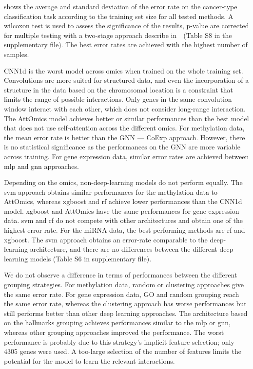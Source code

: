 \documentclass[../main.tex]{subfiles}
\begin{document}
 shows the average and standard deviation of the error rate on the cancer-type classification task according to the training set size for all tested methods.
A wilcoxon test is used to assess the significance of the results, p-value are corrected for multiple testing with a two-stage approach describe in~\cite{10.2307/2346101}~(Table S8 in the supplementary file).
The best error rates are achieved with the highest number of samples.

CNN1d is the worst model across omics when trained on the whole training set.
Convolutions are more suited for structured data, and even the incorporation of a structure in the data based on the chromosomal location is a constraint that limits the range of possible interactions.
Only genes in the same convolution window interact with each other, which does not consider long-range interaction.
The AttOmics model achieves better or similar performances than the best model that does not use self-attention across the different omics.
For methylation data, the mean error rate is better than the GNN --- CoExp approach.
However, there is no statistical significance as the performances on the GNN are more variable across training.
For gene expression data, similar error rates are achieved between \gls{mlp} and \gls{gnn} approaches.

Depending on the omics, non-deep-learning models do not perform equally.
The \gls{svm} approach obtains similar performances for the methylation data to AttOmics, whereas \gls{xgboost} and \gls{rf} achieve lower performances than the CNN1d model.
\gls{xgboost} and AttOmics have the same performances for gene expression data.
\gls{svm} and \gls{rf} do not compete with other architectures and obtain one of the highest error-rate.
For the miRNA data, the best-performing methods are \gls{rf} and \gls{xgboost}.
The \gls{svm} approach obtains an error-rate comparable to the deep-learning architecture, and there are no differences between the different deep-learning models (Table S6 in supplementary file).

We do not observe a difference in terms of performances between the different grouping strategies.
For methylation data, random or clustering approaches give the same error rate.
For gene expression data, GO and random grouping reach the same error rate, whereas the clustering approach has worse performances but still performs better than other deep learning approaches.
The architecture based on the hallmarks grouping achieves performances similar to the \gls{mlp} or \gls{gnn}, whereas other grouping approaches improved the performance.
The worst performance is probably due to this strategy's implicit feature selection; only 4305 genes were used.
A too-large selection of the number of features limits the potential for the model to learn the relevant interactions.
\end{document}
